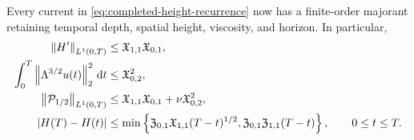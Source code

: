 {\begin{theorem}
Every current in \eqref{eq:completed-height-recurrence} now has a
finite-order majorant retaining temporal depth, spatial height, viscosity,
and horizon.
In particular,
\begin{align}
 \left\lVert H'\right\rVert_{L^1(0,T)}
 &\le\mathfrak X_{1,1}\mathfrak X_{0,1},
 \label{eq:qc-sharp-height-variation}\\
 \int_0^T\left\lVert \Lambda^{3/2}u(t)\right\rVert_2^2\,\mathrm d t
 &\le\mathfrak X_{0,2}^2,
 \label{eq:qc-sharp-critical-dissipation}\\
 \left\lVert \mathcal P_{1/2}\right\rVert_{L^1(0,T)}
 &\le\mathfrak X_{1,1}\mathfrak X_{0,1}
 +\nu\mathfrak X_{0,2}^2,
 \label{eq:qc-sharp-critical-current}\\
 |H(T)-H(t)|
 &\le\min\left\{
 \mathfrak Z_{0,1}\mathfrak X_{1,1}(T-t)^{1/2},
 \mathfrak Z_{0,1}\mathfrak Z_{1,1}(T-t)
 \right\},
 \qquad 0\le t\le T.
 \label{eq:qc-sharp-critical-modulus}
\end{align}


\end{theorem}}
